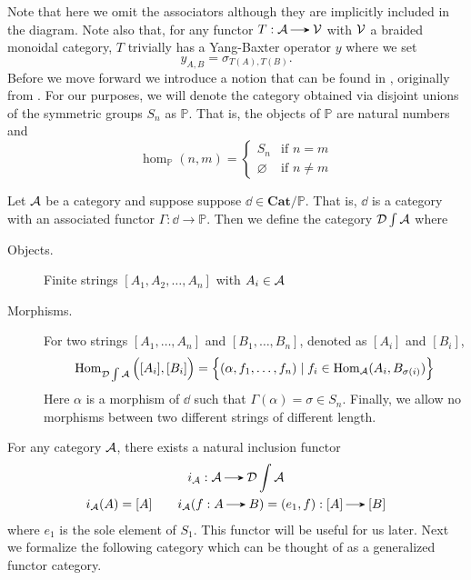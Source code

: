 Note that here we omit the associators although they are implicitly included in the diagram. 
Note also that, for any functor 
$T: \aa \to \vv$ with $\vv$ a braided monoidal category,
$T$ trivially has a Yang-Baxter operator $y$ where we set 
\[
    y_{A,B} = \sigma_{T(A),T(B)}.
\]
Before we move forward we introduce a notion that can be found in \cite{Joyal1993BraidedTC}, originally from \cite{kelly_clubs}.
For our purposes, we will denote the category obtained via disjoint unions of the symmetric groups $S_n$ as $\mathbb{P}$. That is, the objects of $\mathbb{P}$ are natural numbers and 
\[
    \hom_{\mathbb{P}}(n,m)
    =
    \begin{cases}
        S_n & \text{if } n = m\\
        \varnothing & \text{if } n \ne m 
    \end{cases}
\]

\begin{definition}
   Let $\aa$ be a category and suppose suppose $\dd \in \textbf{Cat}/\mathbb{P}$. That is, $\dd$ is a category with an associated functor
   $\Gamma: \dd \to \mathbb{P}$. Then we define the category $\dd\int\aa$ where 
    \begin{description}
        \item[Objects.] Finite strings $[A_1, A_2, \dots, A_n]$ with $A_i \in \aa$
        \item[Morphisms.] For two strings $[A_1, \dots, A_n]$ and $[B_1, \dots, B_n]$, denoted as $[A_i]$ and $[B_i]$,
        \[
            \hom_{\dd\int\aa}\Big([A_i],[B_i]\Big)
            =
            \Big\{(\alpha, f_1, \dots, f_n) \mid f_i \in \hom_{\aa}(A_i, B_{\sigma(i)})  \Big\}
        \]
        Here $\alpha$ is a morphism of $\dd$ such that $\Gamma(\alpha) = \sigma \in S_n$.
        Finally, we allow no morphisms between two different strings of different length.
    \end{description}
\end{definition}
For any category $\aa$, there exists a natural inclusion functor 
\begin{gather*}
    i_{\aa}: \aa \to \dd\int\aa\\
    i_{\aa}(A) = [A]
    \qquad
    i_{\aa}(f: A \to B) = (e_1,f) : [A] \to [B]
\end{gather*}
where $e_1$ is the sole element of $S_1$. This functor will be useful for us later.
Next we formalize the following category which can be thought of as a generalized functor category. 

